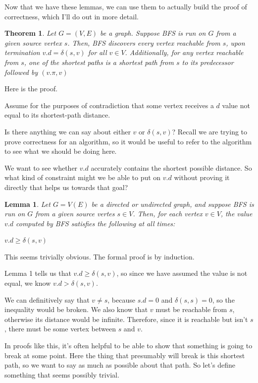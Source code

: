 \documentclass[]{article}
\newtheorem{theorem}{Theorem}
\newtheorem{lemma}{Lemma}
\begin{document}
Now that we have these lemmas, we can use them to actually build the proof of correctness, which I'll do out in more detail. 

\begin{theorem}
    Let $G = (V,E)$ be a graph. Suppose BFS is run on $G$ from a given source vertex $s$. Then, BFS discovers every vertex reachable from $s$, upon termination $v.d = \delta(s,v)$ for all $v \in V$. Additionally, for any vertex reachable from $s$, one of the shortest paths is a shortest path from $s$ to its predecessor followed by $(v.\pi, v)$
\end{theorem}

Here is the proof. 

Assume for the purposes of contradiction that some vertex receives a $d$ value not equal to its shortest-path distance. 

Is there anything we can say about either $v$ or $\delta(s,v)$? Recall we are trying to prove correctness for an algorithm, so it would be useful to refer to the algorithm to see what we should be doing here. 

We want to see whether $v.d$ accurately contains the shortest possible distance. So what kind of constraint might we be able to put on $v.d$ without proving it directly that helps us towards that goal? 

\begin{lemma}
    Let $G = V(E)$ be a directed or undirected graph, and suppose BFS is run on $G$ from a given source vertes $s \in V$. Then, for each vertex $v \in V$, the value $v.d$ computed by BFS satisfies the following at all times:

    $v.d \geq \delta(s,v)$
\end{lemma}

This seems trivially obvious. The formal proof is by induction.

Lemma 1 tells us that $v.d \geq \delta(s,v)$, so since we have assumed the value is not equal, we know $v.d > \delta(s,v)$. 

We can definitively say that $v \neq s$, because $s.d = 0$ and $\delta(s,s) = 0$, so the inequality would be broken. We also know that $v$ must be reachable from $s$, otherwise its distance would be infinite. Therefore, since it is reachable but isn't $s$, there must be some vertex between $s$ and $v$.

In proofs like this, it's often helpful to be able to show that something is going to break at some point. Here the thing that presumably will break is this shortest path, so we want to say as much as possible about that path. So let's define something that seems possibly trivial. 
\end{document}
